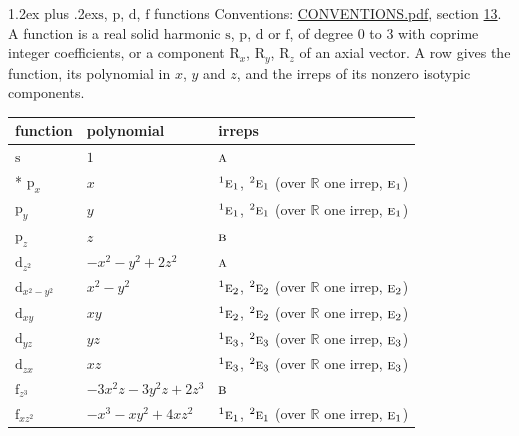 \documentclass[10pt,a4paper]{article}
\makeatletter
\renewcommand\section{\@startsection{section}{1}{\z@}{-3ex plus -1ex minus -.2ex}%
  {1.2ex plus .2ex}{\normalfont\large\sffamily\bfseries\color{parttitle}}}
\numberwithin{equation}{section}
\newcommand{\irr}[1]{\text{\normalfont\scshape #1}}
\newcommand{\conjpair}[1]{{}^{#1}}
\newcommand{\orbital}[1]{\mathrm{#1}}
\makeatother
\begin{document}
\section{\texorpdfstring{$\orbital{s}$, $\orbital{p}$, $\orbital{d}$, $\orbital{f}$}{s, p, d, f} functions}\label{s:orbitals}
Conventions: \href{../../CONVENTIONS.pdf}{CONVENTIONS.pdf}, section \href{../../CONVENTIONS.pdf\#conv.13}{13}.
\leavevmode\label{n:head.function}A function is a real solid harmonic $\orbital{s}$, $\orbital{p}$, $\orbital{d}$ or $\orbital{f}$, of degree 0 to 3 with coprime integer coefficients, or a component $\orbital{R}_{x}$, $\orbital{R}_{y}$, $\orbital{R}_{z}$ of an axial vector. \label{n:head.polynomial}\label{n:head.irreps}A row gives the function, its polynomial in $x$, $y$ and $z$, and the irreps of its nonzero isotypic components.
{\small\begin{longtable}{@{}lll@{}}\toprule
function & polynomial & irreps\\\midrule\endhead
\bottomrule\endfoot\endlastfoot
$\orbital{s}$ & $1$ & $\irr{a}$\\*
$\orbital{p}_{x}$ & $x$ & $\conjpair{1}\irr{e}_{1}$, $\conjpair{2}\irr{e}_{1}$ (over $\mathbb{R}$ one irrep, $\irr{e}_{1}$)\\
$\orbital{p}_{y}$ & $y$ & $\conjpair{1}\irr{e}_{1}$, $\conjpair{2}\irr{e}_{1}$ (over $\mathbb{R}$ one irrep, $\irr{e}_{1}$)\\
$\orbital{p}_{z}$ & $z$ & $\irr{b}$\\
$\orbital{d}_{z^2}$ & $-x^{2} - y^{2} + 2z^{2}$ & $\irr{a}$\\
$\orbital{d}_{x^2-y^2}$ & $x^{2} - y^{2}$ & $\conjpair{1}\irr{e}_{2}$, $\conjpair{2}\irr{e}_{2}$ (over $\mathbb{R}$ one irrep, $\irr{e}_{2}$)\\
$\orbital{d}_{xy}$ & $xy$ & $\conjpair{1}\irr{e}_{2}$, $\conjpair{2}\irr{e}_{2}$ (over $\mathbb{R}$ one irrep, $\irr{e}_{2}$)\\
$\orbital{d}_{yz}$ & $yz$ & $\conjpair{1}\irr{e}_{3}$, $\conjpair{2}\irr{e}_{3}$ (over $\mathbb{R}$ one irrep, $\irr{e}_{3}$)\\
$\orbital{d}_{zx}$ & $xz$ & $\conjpair{1}\irr{e}_{3}$, $\conjpair{2}\irr{e}_{3}$ (over $\mathbb{R}$ one irrep, $\irr{e}_{3}$)\\
$\orbital{f}_{z^3}$ & $-3x^{2}z - 3y^{2}z + 2z^{3}$ & $\irr{b}$\\
$\orbital{f}_{xz^2}$ & $-x^{3} - xy^{2} + 4xz^{2}$ & $\conjpair{1}\irr{e}_{1}$, $\conjpair{2}\irr{e}_{1}$ (over $\mathbb{R}$ one irrep, $\irr{e}_{1}$)\\

\end{longtable}}
\end{document}
